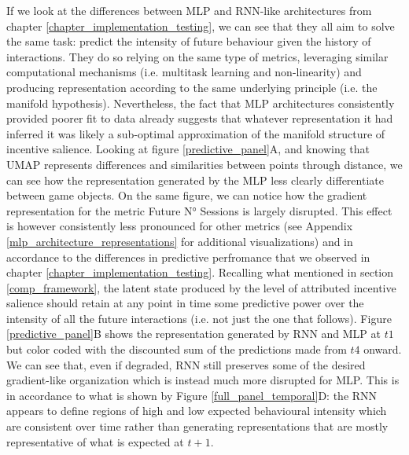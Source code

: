 If we look at the differences between MLP and RNN-like architectures from chapter \ref{chapter_implementation_testing}, we can see that they all aim to solve the same task: predict the intensity of future behaviour given the history of interactions. They do so relying on the same type of metrics, leveraging similar computational mechanisms (i.e. multitask learning and non-linearity) and producing representation according to the same underlying principle (i.e. the manifold hypothesis). Nevertheless, the fact that MLP architectures consistently provided poorer fit to data already suggests that whatever representation it had inferred it was likely a sub-optimal approximation of the manifold structure of incentive salience. Looking at figure \ref{predictive_panel}A, and knowing that UMAP represents differences and similarities between points through distance, we can see how the representation generated by the MLP less clearly differentiate between game objects. On the same figure, we can notice how the gradient representation for the metric Future N° Sessions is largely disrupted. This effect is however consistently less pronounced for other metrics (see Appendix \ref{mlp_architecture_representations} for additional visualizations) and in accordance to the differences in predictive perfromance that we observed in chapter \ref{chapter_implementation_testing}. Recalling what mentioned in section \ref{comp_framework}, the latent state produced by the level of attributed incentive salience should retain at any point in time some predictive power over the intensity of all the future interactions (i.e. not just the one that follows). Figure \ref{predictive_panel}B shows the representation generated by RNN and MLP at $t1$ but color coded with the discounted sum of the predictions made from $t4$ onward. We can see that, even if degraded, RNN still preserves some of the desired gradient-like organization which is instead much more disrupted for MLP. This is in accordance to what is shown by Figure \ref{full_panel_temporal}D: the RNN appears to define regions of high and low expected behavioural intensity which are consistent over time rather than generating representations that are mostly representative of what is expected at $t+1$.

